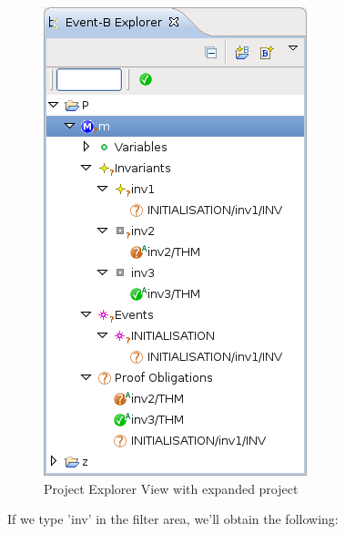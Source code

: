 \begin{figure}[!h]
\begin{center}
	\includegraphics{img/reference/ref_01_project_explorer4.png}
	\caption{Project Explorer View with expanded project}
	\label{fig_ref_01_project_explorer4}
\end{center}
\end{figure}

If we type 'inv' in the filter area, we'll obtain the following:

